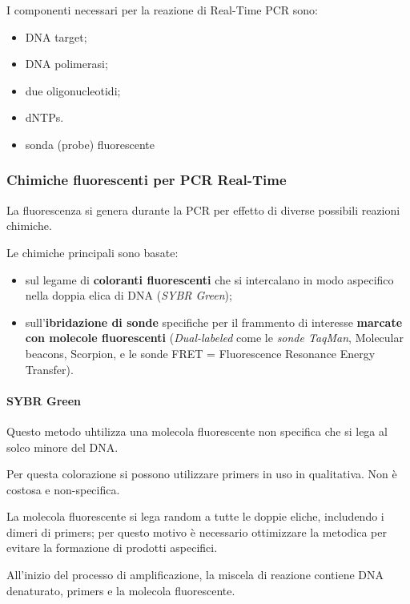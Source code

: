 \documentclass[]{article}
\begin{document}
I componenti necessari per la reazione di Real-Time PCR sono:

\begin{itemize}
\itemsep1pt\parskip0pt
\item
  DNA target;
\item
  DNA polimerasi;
\item
  due oligonucleotidi;
\item
  dNTPs.
\item
  sonda (probe) fluorescente
\end{itemize}

\subsubsection{Chimiche fluorescenti per PCR
Real-Time}\label{chimiche-fluorescenti-per-pcr-real-time}

La fluorescenza si genera durante la PCR per effetto di diverse
possibili reazioni chimiche.

Le chimiche principali sono basate:

\begin{itemize}
\itemsep1pt\parskip0pt
\item
  sul legame di \textbf{coloranti fluorescenti} che si intercalano in
  modo aspecifico nella doppia elica di DNA (\emph{SYBR Green});
\item
  sull'\textbf{ibridazione di sonde} specifiche per il frammento di
  interesse \textbf{marcate con molecole fluorescenti}
  (\emph{Dual-labeled} come le \emph{sonde TaqMan}, Molecular beacons,
  Scorpion, e le sonde FRET = Fluorescence Resonance Energy Transfer).
\end{itemize}

\paragraph{SYBR Green}\label{sybr-green}

Questo metodo uhtilizza una molecola fluorescente non specifica che si
lega al solco minore del DNA.

Per questa colorazione si possono utilizzare primers in uso in
qualitativa. Non è costosa e non-specifica.

La molecola fluorescente si lega random a tutte le doppie eliche,
includendo i dimeri di primers; per questo motivo è necessario
ottimizzare la metodica per evitare la formazione di prodotti
aspecifici.

All'inizio del processo di amplificazione, la miscela di reazione
contiene DNA denaturato, primers e la molecola fluorescente.
\end{document}
